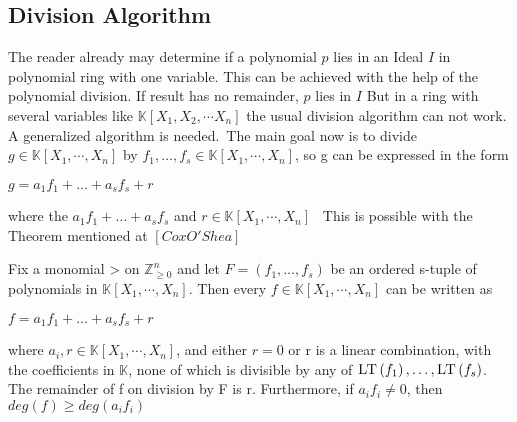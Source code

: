 \subsection{Division Algorithm}
\label{subsec:division}

The reader already may determine if a polynomial $p$ lies in an Ideal $I$ in polynomial ring with one variable. This can be achieved with the help of the polynomial division.
If result has no remainder, $p$ lies in $I$
But in a ring with several variables like $ \mathbb{K} \left[X_{1},X_{2},\cdots X_{n}\right] $ the usual division algorithm can not work. A generalized algorithm is needed.\
The main goal now is to divide $g \in \mathbb{K}\left[X_{1}, \cdots, X_{n}\right] $ by 
$f_{1}, \ldots, f_{s} \in \mathbb{K}\left[X_{1}, \cdots, X_{n}\right]$, so g can be expressed in the form \begin{center}
$g = a_{1}f_{1}+ \ldots + a_{s}f_{s} +r$
\end{center} 
where the $a_{1}f_{1}+ \ldots + a_{s}f_{s} $ and $r \in \mathbb{K}\left[X_{1}, \cdots, X_{n}\right]$ \
This is possible with the Theorem mentioned at  $\left[ Cox O'Shea\right] $


Fix a monomial > on $ \mathbb{Z}_{\geq 0}^{n}$ and let $ F = \left( f_{1}, \ldots, f_{s}\right) $ be an ordered s-tuple of polynomials in $ \mathbb{K}\left[X_{1}, \cdots, X_{n}\right]$. Then every  $ f \in \mathbb{K}\left[X_{1}, \cdots, X_{n}\right]$ can be written as
\begin{center}
$ f = a_{1}f_{1}+ \ldots + a_{s}f_{s} + r$
\end{center}
where $a_{i}, r \in \mathbb{K}\left[X_{1}, \cdots, X_{n}\right] $, and either $ r=0$ or r is a linear combination, with the coefficients in $\mathbb{K}$, none of which is divisible by any of
$\textsc{LT}\left(f_{1} \right), \ldots, \textsc{LT}\left(f_{s} \right)  $.
The remainder of f on division by F is r. Furthermore, if $a_{i}f_{i} \neq 0 $, then
$deg(f) \geq deg(a_{i}f_{i})$




